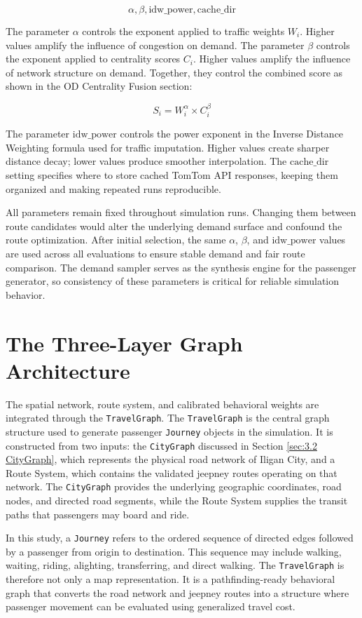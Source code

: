 {{\[
\alpha, \beta, \text{idw\_power}, \text{cache\_dir}
\]

The parameter \(\alpha\) controls the exponent applied to traffic weights \(W_i\). Higher values amplify the influence of congestion on demand. The parameter \(\beta\) controls the exponent applied to centrality scores \(C_i\). Higher values amplify the influence of network structure on demand. Together, they control the combined score as shown in the \ac{OD} Centrality Fusion section:

\[
S_i = W_i^{\alpha} \times C_i^{\beta}
\]

The parameter \(\text{idw\_power}\) controls the power exponent in the Inverse Distance Weighting formula used for traffic imputation. Higher values create sharper distance decay; lower values produce smoother interpolation. The \(\text{cache\_dir}\) setting specifies where to store cached TomTom \ac{API} responses, keeping them organized and making repeated runs reproducible.

All parameters remain fixed throughout simulation runs. Changing them between route candidates would alter the underlying demand surface and confound the route optimization. After initial selection, the same \(\alpha\), \(\beta\), and \(\text{idw\_power}\) values are used across all evaluations to ensure stable demand and fair route comparison. The demand sampler serves as the synthesis engine for the passenger generator, so consistency of these parameters is critical for reliable simulation behavior.

\section{The Three-Layer Graph Architecture}
\label{sec:3.4 three layer graph}
The spatial network, route system, and calibrated behavioral weights are integrated through the \texttt{TravelGraph}. The \texttt{TravelGraph} is the central graph structure used to generate passenger \texttt{Journey} objects in the simulation. It is constructed from two inputs: the \texttt{CityGraph} discussed in Section \ref{sec:3.2 CityGraph}, which represents the physical road network of Iligan City, and a Route System, which contains the validated jeepney routes operating on that network. The \texttt{CityGraph} provides the underlying geographic coordinates, road nodes, and directed road segments, while the Route System supplies the transit paths that passengers may board and ride.

In this study, a \texttt{Journey} refers to the ordered sequence of directed edges followed by a passenger from origin to destination. This sequence may include walking, waiting, riding, alighting, transferring, and direct walking. The \texttt{TravelGraph} is therefore not only a map representation. It is a pathfinding-ready behavioral graph that converts the road network and jeepney routes into a structure where passenger movement can be evaluated using generalized travel cost.

}}
